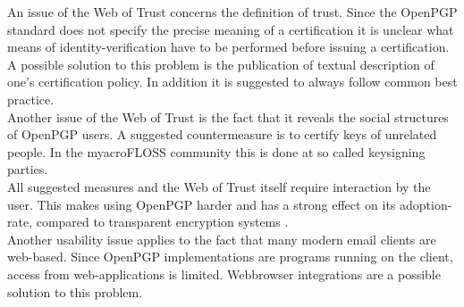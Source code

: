 An issue of the Web of Trust concerns the definition of trust. Since the OpenPGP standard \cite{RFC4880} does not specify the precise meaning of a certification it is unclear what means of identity-verification have to be performed before issuing a certification. A possible solution to this problem is the publication of textual description of one's certification policy. In addition it is suggested to always follow common best practice.   \\

Another issue of the Web of Trust is the fact that it reveals the social structures of OpenPGP users. A suggested countermeasure is to certify keys of unrelated people. In the myacro{FLOSS} community this is done at so called keysigning parties.  \\

All suggested measures and the Web of Trust itself require interaction by the user. This makes using OpenPGP harder and has a strong effect on its adoption-rate, compared to transparent encryption systems \cite{Green2014}. \\

Another usability issue applies to the fact that many modern email clients are web-based. Since OpenPGP implementations are programs running on the client, access from web-applications is limited. Webbrowser integrations are a possible solution to this problem. 














